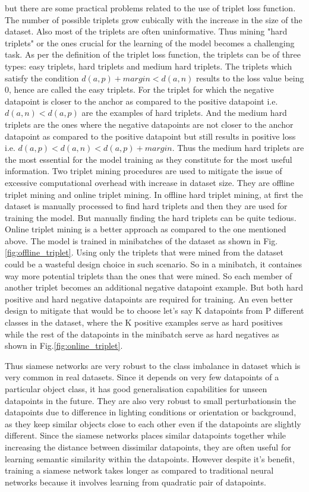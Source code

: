 but there are some practical problems related to the use of triplet loss function. The number of possible triplets grow cubically with the increase in the size of the dataset. Also most of the triplets are often uninformative. Thus mining "hard triplets" or the ones crucial for the learning of the model becomes a challenging task. As per the definition of the triplet loss function, the triplets can be of three types: easy triplets, hard triplets and medium hard triplets. The triplets which satisfy the condition $d(a,p)+margin<d(a,n)$ results to the loss value being 0, hence are called the easy triplets.\cite*{triplet_loss} For the triplet for which the negative datapoint is closer to the anchor as compared to the positive datapoint i.e. $d(a,n)<d(a,p)$ are the examples of hard triplets.\cite*{triplet_loss} And the medium hard triplets are the ones where the negative datapoints are not closer to the anchor datapoint as compared to the positive datapoint but still results in positive loss i.e. $d(a,p)<d(a,n)<d(a,p)+margin$.\cite*{triplet_loss} Thus the medium hard triplets are the most essential for the model training as they constitute for the most useful information. Two triplet mining procedures are used to mitigate the issue of excessive computational overhead with increase in dataset size. They are offline triplet mining and online triplet mining. In offline hard triplet mining, at first the dataset is manually processed to find hard triplets and then they are used for training the model. But manually finding the hard triplets can be quite tedious. Online triplet mining is a better approach as compared to the one mentioned above. The model is trained in minibatches of the dataset as shown in Fig.\ref*{fig:offline_triplet}. Using only the triplets that were mined from the dataset could be a wasteful design choice in such scenario. So in a minibatch, it containes way more potential triplets than the ones that were mined. So each member of another triplet becomes an additional negative datapoint example. But both hard positive and hard negative datapoints are required for training. An even better design to mitigate that would be to choose let's say K datapoints from P different classes in the dataset, where the K positive examples serve as hard positives while the rest of the datapoints in the minibatch serve as hard negatives as shown in Fig.\ref*{fig:online_triplet}\cite*{hermans2017defense}.

Thus siamese networks are very robust to the class imbalance in dataset which is very common in real datasets. Since it depends on very few datapoints of a particular object class, it has good generalisation capabilities for unseen datapoints in the future. They are also very robust to small perturbationsin the datapoints due to difference in lighting conditions or orientation or background, as they keep similar objects close to each other even if the datapoints are slightly different. Since the siamese networks places similar datapoints together while increasing the distance between dissimilar datapoints, they are often useful for learning semantic similarity within the datapoints. However despite it's benefit, training a siamese network takes longer as compared to traditional neural networks because it involves learning from quadratic pair of datapoints.\cite*{siamese_network}
